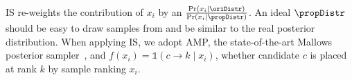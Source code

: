 IS re-weights the contribution of $x_i$ by an  $\frac{\Pr(x_i \mid \oriDistr)}{\Pr(x_i \mid \propDistr)}$.
An ideal $\propDistr$ should be easy to draw samples from and be similar to the real posterior distribution.
When applying IS, we adopt AMP, the state-of-the-art Mallows posterior sampler~\cite{DBLP:journals/jmlr/LuB14}, and $f(x_i) = \mathds{1}(c {\rightarrow} k \mid x_i)$, \ie whether candidate $c$ is placed at rank $k$ by sample ranking $x_i$.
